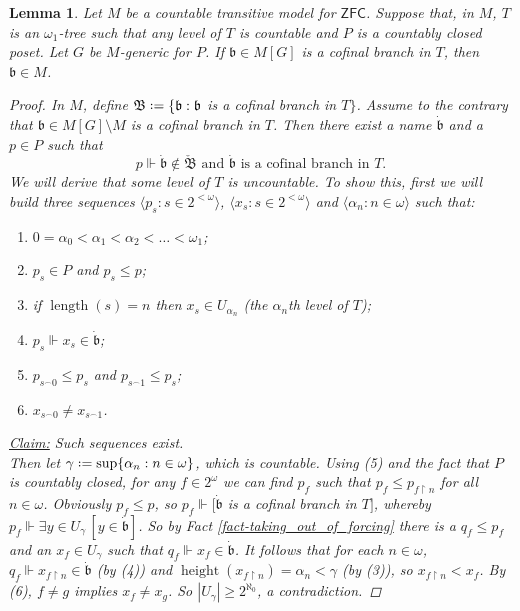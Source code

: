 \documentclass[11pt,a4paper]{report}
\newtheorem{lemma}[theorem]{Lemma}
\theoremstyle{definition}
\theoremstyle{num.custom-title}
\theoremstyle{custom-title}
\newenvironment{claim}[1]{\par\noindent\underline{Claim#1:}\space}{} %
\DeclareMathOperator{\sm}{\setminus}
\DeclareMathOperator{\height}{height}
\DeclareMathOperator{\length}{length}
\DeclareMathOperator{\restr}{\upharpoonright}
\newcommand{\ZFC}{\ensuremath{\mathsf{ZFC}}\xspace}
\newcommand{\B}{\mathcal{B}}
\newcommand{\conc}{^\frown}
\newcommand*{\defeq}{\mathrel{\rlap{%
                     \raisebox{0.3ex}{$\cdot$}}%
                     \raisebox{-0.3ex}{$\cdot$}}%
                     =}
\newcommand{\forces}{\Vdash}
\begin{document}
\begin{lemma}\label{lemma-preserving_uncountable_branches}
\renewcommand{\b}{\mathfrak{b}}
\renewcommand{\B}{\mathfrak{B}}
Let $M$ be a countable transitive model for \ZFC. Suppose that, in $M$, $T$ is an $\omega_1$-tree such that any level of $T$ is countable and $P$ is a countably closed poset. Let $G$ be $M$-generic for $P$. If $\mathfrak{b} \in M[G]$ is a cofinal branch in $T$, then $\mathfrak{b} \in M$.
\begin{proof}
In $M$, define $\B \defeq \{\b : \b$ is a cofinal branch in $T\}$.
Assume to the contrary that $\b \in M[G] \sm M$ is a cofinal branch in $T$. Then there exist a name $\dot{\b}$ and a $p \in P$ such that 
\[
p \forces \dot{\b} \not\in \check{\B} \text{ and } \dot{\b} \text{ is a cofinal branch in } T.
\]
We will derive that some level of $T$ is uncountable. To show this, first we will build three sequences $\langle p_s : s \in 2^{<\omega} \rangle$, $\langle x_s : s \in 2^{<\omega} \rangle$ and $\langle \alpha_n : n \in \omega \rangle$ such that:
\begin{enumerate}
\item $0 = \alpha_0 < \alpha_1 < \alpha_2 < \ldots < \omega_1$;
\item $p_s \in P$ and $p_s \leq p$;
\item if $\length(s) = n$ then $x_s \in U_{\alpha_n}$ (the $\alpha_n$th level of $T$);
\item $p_s \forces x_s \in \dot{\b}$;
\item $p_{s \conc 0} \leq p_s$ and $p_{s \conc 1} \leq p_s$;
\item $x_{s \conc 0} \neq x_{s \conc 1}$.
\end{enumerate}
%
\begin{claim}{}
Such sequences exist.
\end{claim}\\
\indent Then let $\gamma \defeq \sup\{\alpha_n : n \in \omega\}$, which is countable. Using (5) and the fact that $P$ is countably closed, for any $f \in 2^\omega$ we can find $p_f$ such that $p_f \leq p_{f \restr n}$ for all $n \in \omega$. Obviously $p_f \leq p$, so $p_f \forces [\dot{\b}$ is a cofinal branch in $T]$, whereby $p_f \forces \exists y \in U_\gamma \, [y \in \dot{\b}]$. So by Fact \ref{fact-taking_out_of_forcing} there is a $q_f \leq p_f$ and an $x_f \in U_\gamma$ such that $q_f \forces x_f \in \dot{\b}$. It follows that for each $n \in \omega$, $q_f \forces x_{f \restr n} \in \dot{\b}$ (by (4)) and $\height(x_{f \restr n}) = \alpha_n < \gamma$ (by (3)), so $x_{f \restr n} < x_f$. By (6), $f \neq g$ implies $x_f \neq x_g$. So $|U_\gamma| \geq 2^{\aleph_0}$, a contradiction.


\end{proof}
\end{lemma}
\end{document}
